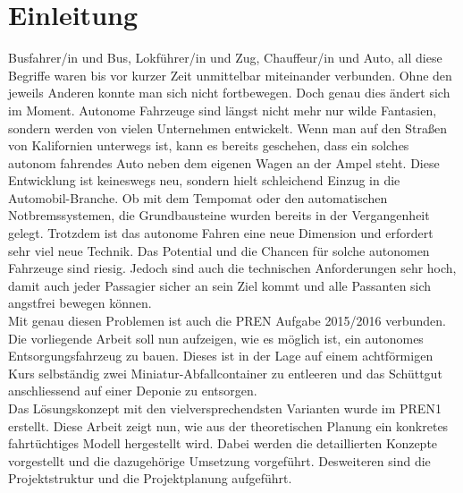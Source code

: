 \section{Einleitung}
Busfahrer/in und Bus, Lokführer/in und Zug, Chauffeur/in und Auto, all diese Begriffe waren bis vor kurzer Zeit unmittelbar miteinander verbunden. Ohne den jeweils Anderen konnte man sich nicht fortbewegen. Doch genau dies ändert sich im Moment. Autonome Fahrzeuge sind längst nicht mehr nur wilde Fantasien, sondern werden von vielen Unternehmen entwickelt. Wenn man auf den Straßen von Kalifornien unterwegs ist, kann es bereits geschehen, dass ein solches autonom fahrendes Auto neben dem eigenen Wagen an der Ampel steht. Diese Entwicklung ist keineswegs neu, sondern hielt schleichend Einzug in die Automobil-Branche. Ob mit dem Tempomat oder den automatischen Notbremssystemen, die Grundbausteine wurden bereits in der Vergangenheit gelegt.
Trotzdem ist das autonome Fahren eine neue Dimension und erfordert sehr viel neue Technik. Das Potential und die Chancen für solche autonomen Fahrzeuge sind riesig. Jedoch sind auch die technischen Anforderungen sehr hoch, damit auch jeder Passagier sicher an sein Ziel kommt und alle Passanten sich angstfrei bewegen können. \\
Mit genau diesen Problemen ist auch die PREN Aufgabe 2015/2016 verbunden. Die vorliegende Arbeit soll nun aufzeigen, wie es möglich ist, ein autonomes Entsorgungsfahrzeug zu bauen. Dieses ist in der Lage auf einem achtförmigen Kurs selbständig zwei Miniatur-Abfallcontainer zu entleeren und das Schüttgut anschliessend auf einer Deponie zu entsorgen.\\
Das Lösungskonzept mit den vielversprechendsten Varianten wurde im PREN1 erstellt. Diese Arbeit zeigt nun, wie aus der theoretischen Planung ein konkretes fahrtüchtiges Modell hergestellt wird. 
Dabei werden die detaillierten Konzepte vorgestellt und die dazugehörige Umsetzung vorgeführt. 
Desweiteren sind die Projektstruktur und die Projektplanung aufgeführt.  

\newpage